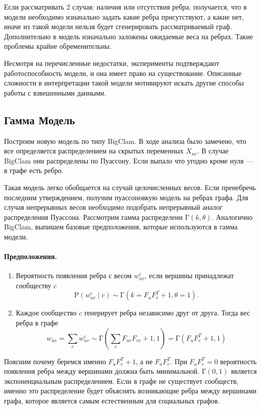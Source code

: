 \documentclass{ITaSconf}
\def\PP{\mathrm{P}}
\begin{document}
Если рассматривать 2 случая: наличия или отсутствия ребра, получается, что в модели необходимо изначально задать какие ребра присутствуют, а какие нет, иначе из такой модели нельзя будет сгенерировать рассматриваемый граф. 
Дополнительно в модель изначально заложены ожидаемые веса на ребрах. 
Такие проблемы крайне обременительны.

Несмотря на перечисленные недостатки, эксперименты подтверждают работоспособность модели, и она имеет право на существование.
Описанные сложности в интерпретации такой модели мотивируют искать другие способы работы с взвешенными данными.

\subsection{Гамма Модель}

Построим новую модель по типу BigClam. 
В ходе анализа было замечено, что все определяется распределением на скрытых переменных $X_{uv}$. 
В случае BigClam они распределены по Пуассону. 
Если выпало что угодно кроме нуля --- в графе есть ребро. 

Такая модель легко обобщается на случай целочисленных весов. 
Если пренебречь последним утверждением, получим пуассоновкую модель на ребрах графа. 
Для случая непрерывных весов необходимо подобрать непрерывный аналог распределения Пуассона.  
Рассмотрим гамма распределени $\mathrm{\Gamma}(k, \theta)$.
Аналогично BigClam, выпишем базовые предположения, которые используются в гамма модели.

\paragraph{Предположения.}
\begin{enumerate}
	\item Вероятность появления ребра с весом $w^{c}_{uv}$, если вершины принадлежат сообществу $c$
	$$\PP\left(w^{c}_{uv} \mid c\right) \sim \mathrm{\Gamma}\left(k=F_u F_v^T + 1, \theta=1\right).$$
	\item Каждое сообщество $c$ генерирует ребра независимо друг от друга. Тогда вес ребра в графе
	$$w_{uv} = \sum_{c} w_{uv}^c \sim \mathrm{\Gamma}\left(\sum_c F_{uc} F_{vc} + 1, 1\right) = \mathrm{\Gamma}\left(F_u F_v^T + 1, 1\right)$$
\end{enumerate}

Поясним почему беремся именно $F_u F_v^T + 1$, а не $F_u F_v^T$.
При $F_u F_v^T=0$ вероятность появления ребра между вершинами должна быть минимальной. 
$\mathrm{\Gamma}(0, 1)$ является экспоненциальным распределением. 
Если в графе не существует сообществ, именно это распределение будет объяснять возникающие ребра между вершинами графа, которое является самым естественным для социальных графов.
\end{document}
